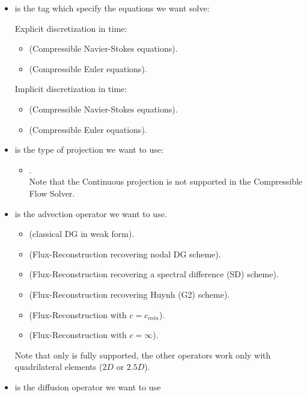 \begin{itemize}
  \item {} is the tag which specify the equations we want solve:

    Explicit discretization in time:
    \begin{itemize}
      \item {} (Compressible Navier-Stokes equations).
      \item {} (Compressible Euler equations).
    \end{itemize}

    Implicit discretization in time:
    \begin{itemize}
      \item {} (Compressible Navier-Stokes equations).
      \item {} (Compressible Euler equations).
    \end{itemize}
  \item {} is the type of projection we want to use:
    \begin{itemize}
      \item {}.\\
        Note that the Continuous projection is not supported in the Compressible Flow Solver.
    \end{itemize}
  \item {} is the advection operator we want to use.
    \begin{itemize}
      \item {} (classical DG in weak form).
      \item {} (Flux-Reconstruction recovering nodal DG scheme).
      \item {} (Flux-Reconstruction recovering a spectral difference (SD) scheme).
      \item {} (Flux-Reconstruction recovering Huynh (G2) scheme).
      \item {} (Flux-Reconstruction with $c = c_{min}$).
      \item {} (Flux-Reconstruction with $c = \infty$).
    \end{itemize}
    Note that only  is fully supported, the other operators work
    only with quadrilateral elements ($2D$ or $2.5D$).
  \item {} is the diffusion operator we want to use

\end{itemize}

